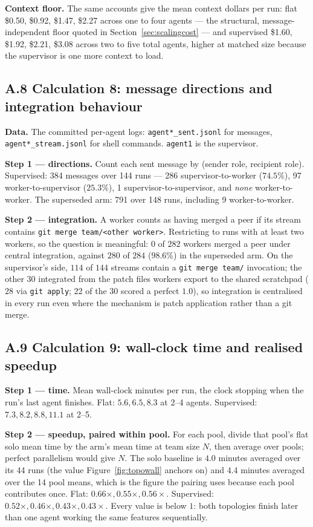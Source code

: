 \documentclass[11pt,a4paper]{article}
\begin{document}
\textbf{Context floor.} The same accounts give the mean context dollars per run: flat \$0.50, \$0.92, \$1.47, \$2.27 across one to four agents --- the structural, message-independent floor quoted in Section~\ref{sec:scalingcost} --- and supervised \$1.60, \$1.92, \$2.21, \$3.08 across two to five total agents, higher at matched size because the supervisor is one more context to load.

\subsection*{A.8 \quad Calculation 8: message directions and integration behaviour}

\textbf{Data.} The committed per-agent logs: \texttt{agent*\_sent.jsonl} for messages, \texttt{agent*\_stream.jsonl} for shell commands. \texttt{agent1} is the supervisor.

\textbf{Step 1 --- directions.} Count each sent message by (sender role, recipient role). Supervised: 384 messages over 144 runs --- 286 supervisor-to-worker ($74.5\%$), 97 worker-to-supervisor ($25.3\%$), 1 supervisor-to-supervisor, and \emph{none} worker-to-worker. The superseded arm: 791 over 148 runs, including 9 worker-to-worker.

\textbf{Step 2 --- integration.} A worker counts as having merged a peer if its stream contains \texttt{git merge team/<other worker>}. Restricting to runs with at least two workers, so the question is meaningful: $0$ of $282$ workers merged a peer under central integration, against $280$ of $284$ ($98.6\%$) in the superseded arm. On the supervisor's side, $114$ of $144$ streams contain a \texttt{git merge team/} invocation; the other $30$ integrated from the patch files workers export to the shared scratchpad ($28$ via \texttt{git apply}; 22 of the 30 scored a perfect $1.0$), so integration is centralised in every run even where the mechanism is patch application rather than a git merge.

\subsection*{A.9 \quad Calculation 9: wall-clock time and realised speedup}

\textbf{Step 1 --- time.} Mean wall-clock minutes per run, the clock stopping when the run's last agent finishes. Flat: $5.6, 6.5, 8.3$ at 2--4 agents. Supervised: $7.3, 8.2, 8.8, 11.1$ at 2--5.

\textbf{Step 2 --- speedup, paired within pool.} For each pool, divide that pool's flat solo mean time by the arm's mean time at team size $N$, then average over pools; perfect parallelism would give $N$. The solo baseline is $4.0$ minutes averaged over its 44 runs (the value Figure~\ref{fig:topowall} anchors on) and $4.4$ minutes averaged over the 14 pool means, which is the figure the pairing uses because each pool contributes once. Flat: $0.66\times, 0.55\times, 0.56\times$. Supervised: $0.52\times, 0.46\times, 0.43\times, 0.43\times$. Every value is below $1$: both topologies finish later than one agent working the same features sequentially.
\end{document}
